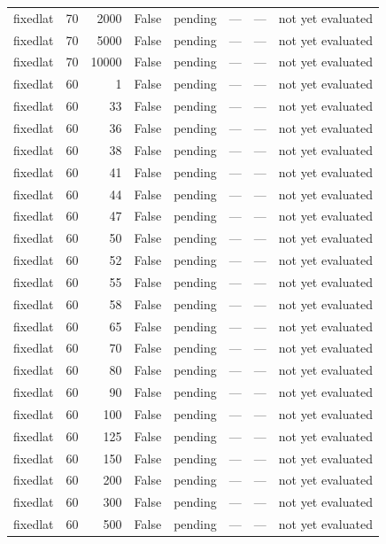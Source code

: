 \begin{tabular}{lrrrlrrl}
fixedlat & 70 & 2000 & False & pending & — & — & not yet evaluated \\
fixedlat & 70 & 5000 & False & pending & — & — & not yet evaluated \\
fixedlat & 70 & 10000 & False & pending & — & — & not yet evaluated \\
fixedlat & 60 & 1 & False & pending & — & — & not yet evaluated \\
fixedlat & 60 & 33 & False & pending & — & — & not yet evaluated \\
fixedlat & 60 & 36 & False & pending & — & — & not yet evaluated \\
fixedlat & 60 & 38 & False & pending & — & — & not yet evaluated \\
fixedlat & 60 & 41 & False & pending & — & — & not yet evaluated \\
fixedlat & 60 & 44 & False & pending & — & — & not yet evaluated \\
fixedlat & 60 & 47 & False & pending & — & — & not yet evaluated \\
fixedlat & 60 & 50 & False & pending & — & — & not yet evaluated \\
fixedlat & 60 & 52 & False & pending & — & — & not yet evaluated \\
fixedlat & 60 & 55 & False & pending & — & — & not yet evaluated \\
fixedlat & 60 & 58 & False & pending & — & — & not yet evaluated \\
fixedlat & 60 & 65 & False & pending & — & — & not yet evaluated \\
fixedlat & 60 & 70 & False & pending & — & — & not yet evaluated \\
fixedlat & 60 & 80 & False & pending & — & — & not yet evaluated \\
fixedlat & 60 & 90 & False & pending & — & — & not yet evaluated \\
fixedlat & 60 & 100 & False & pending & — & — & not yet evaluated \\
fixedlat & 60 & 125 & False & pending & — & — & not yet evaluated \\
fixedlat & 60 & 150 & False & pending & — & — & not yet evaluated \\
fixedlat & 60 & 200 & False & pending & — & — & not yet evaluated \\
fixedlat & 60 & 300 & False & pending & — & — & not yet evaluated \\
fixedlat & 60 & 500 & False & pending & — & — & not yet evaluated \\

\end{tabular}
